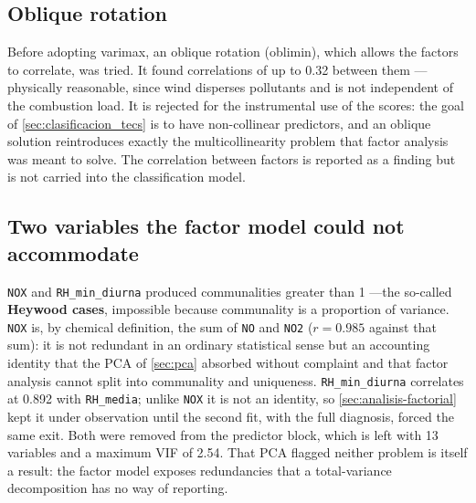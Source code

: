 \subsection{Oblique rotation}

Before adopting varimax, an oblique rotation (oblimin), which allows the
factors to correlate, was tried. It found correlations of up to 0.32 between
them ---physically reasonable, since wind disperses pollutants and is not
independent of the combustion load. It is rejected for the instrumental use of
the scores: the goal of \cref{sec:clasificacion_tecs} is to have
non-collinear predictors, and an oblique solution reintroduces exactly the
multicollinearity problem that factor analysis was meant to solve. The
correlation between factors is reported as a finding but is not carried into
the classification model.

\subsection{Two variables the factor model could not accommodate}

\texttt{NOX} and \texttt{RH\_min\_diurna} produced communalities greater than
1 ---the so-called \textbf{Heywood cases}, impossible because communality is a
proportion of variance. \texttt{NOX} is, by chemical definition, the sum of
\texttt{NO} and \texttt{NO2} ($r=0.985$ against that sum): it is not redundant
in an ordinary statistical sense but an accounting identity that the PCA of
\cref{sec:pca} absorbed without complaint and that factor analysis cannot
split into communality and uniqueness. \texttt{RH\_min\_diurna} correlates at
0.892 with \texttt{RH\_media}; unlike \texttt{NOX} it is not an identity, so
\cref{sec:analisis-factorial} kept it under observation until the second fit,
with the full diagnosis, forced the same exit. Both were removed from the
predictor block, which is left with 13 variables and a maximum VIF of 2.54.
That PCA flagged neither problem is itself a result: the factor model exposes
redundancies that a total-variance decomposition has no way of reporting.
